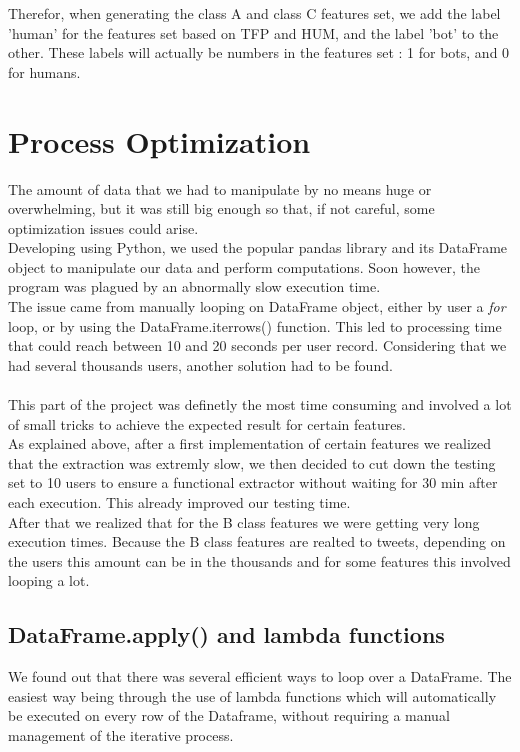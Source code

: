 \documentclass[a4paper,11pt]{article}
\begin{document}
Therefor, when generating the class A and class C features set, we add the label 'human' for the features set based on TFP and HUM, and the label 'bot' to the other. These labels will actually be numbers in the features set : 1 for bots, and 0 for humans.

\section{Process Optimization}
The amount of data that we had to manipulate by no means huge or overwhelming, but it was still big enough so that, if not careful, some optimization issues could arise.\\

Developing using Python, we used the popular pandas library and its DataFrame object to manipulate our data and perform computations. Soon however, the program was plagued by an abnormally slow execution time.\\

The issue came from manually looping on DataFrame object, either by user a \textit{for} loop, or by using the DataFrame.iterrows() function. This led to processing time that could reach between 10 and 20 seconds per user record. Considering that we had several thousands users, another solution had to be found.\\\\
This part of the project was definetly the most time consuming and involved a lot of small tricks to achieve the expected result for certain features.\\
As explained above, after a first implementation of certain features we realized that the extraction was extremly slow, we then decided to cut down the testing set to 10 users to ensure a functional extractor without waiting for 30 min after each execution. This already improved our testing time.\\
After that we realized that for the B class features we were getting very long execution times. Because the B class features are realted to tweets, depending on the users this amount can be in the thousands and for some features this involved looping a lot.

\subsection{DataFrame.apply() and lambda functions}
We found out that there was several efficient ways to loop over a DataFrame. The easiest way being through the use of lambda functions which will automatically be executed on every row of the Dataframe, without requiring a manual management of the iterative process.\\
\end{document}
